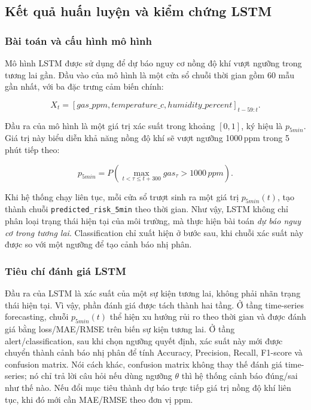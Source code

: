 \subsection{Kết quả huấn luyện và kiểm chứng LSTM}
\label{sec:lstm_eval}

\subsubsection{Bài toán và cấu hình mô hình}

Mô hình LSTM được sử dụng để dự báo nguy cơ nồng độ khí vượt ngưỡng trong tương lai gần. Đầu vào của mô hình là một cửa sổ chuỗi thời gian gồm 60 mẫu gần nhất, với ba đặc trưng cảm biến chính:

\[
X_t = [gas\_ppm, temperature\_c, humidity\_percent]_{t-59:t}.
\]

Đầu ra của mô hình là một giá trị xác suất trong khoảng $[0,1]$, ký hiệu là $p_{5min}$. Giá trị này biểu diễn khả năng nồng độ khí sẽ vượt ngưỡng 1000\,ppm trong 5 phút tiếp theo:

\[
p_{5min} = P\left(\max_{t < \tau \leq t+300} gas_\tau > 1000\,ppm\right).
\]

Khi hệ thống chạy liên tục, mỗi cửa sổ trượt sinh ra một giá trị $p_{5min}(t)$, tạo thành chuỗi \texttt{predicted\_risk\_5min} theo thời gian. Như vậy, LSTM không chỉ phân loại trạng thái hiện tại của môi trường, mà thực hiện bài toán \emph{dự báo nguy cơ trong tương lai}. Classification chỉ xuất hiện ở bước sau, khi chuỗi xác suất này được so với một ngưỡng để tạo cảnh báo nhị phân.

\subsubsection{Tiêu chí đánh giá LSTM}

Đầu ra của LSTM là xác suất của một sự kiện tương lai, không phải nhãn trạng thái hiện tại. Vì vậy, phần đánh giá được tách thành hai tầng. Ở tầng time-series forecasting, chuỗi $p_{5min}(t)$ thể hiện xu hướng rủi ro theo thời gian và được đánh giá bằng loss/MAE/RMSE trên biến sự kiện tương lai. Ở tầng alert/classification, sau khi chọn ngưỡng quyết định, xác suất này mới được chuyển thành cảnh báo nhị phân để tính Accuracy, Precision, Recall, F1-score và confusion matrix. Nói cách khác, confusion matrix không thay thế đánh giá time-series; nó chỉ trả lời câu hỏi nếu dùng ngưỡng $\theta$ thì hệ thống cảnh báo đúng/sai như thế nào. Nếu đổi mục tiêu thành dự báo trực tiếp giá trị nồng độ khí liên tục, khi đó mới cần MAE/RMSE theo đơn vị ppm.

